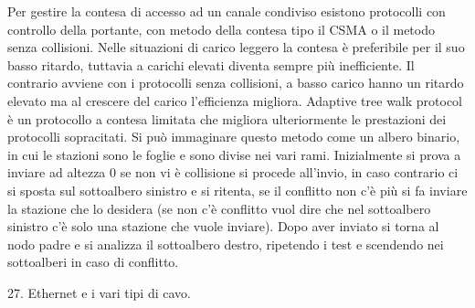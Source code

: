 Per gestire la contesa di accesso ad un canale condiviso esistono protocolli con controllo della portante, con metodo della contesa tipo il CSMA o il metodo senza collisioni. Nelle situazioni di carico leggero la contesa è preferibile per il suo basso ritardo, tuttavia a carichi elevati diventa sempre più inefficiente. Il contrario avviene con i protocolli senza collisioni, a basso carico hanno un ritardo elevato ma al crescere del carico l’efficienza migliora.
Adaptive tree walk protocol è un protocollo a contesa limitata che migliora ulteriormente le prestazioni dei protocolli sopracitati.
Si può immaginare questo metodo come un albero binario, in cui le stazioni sono le foglie e sono divise nei vari rami. Inizialmente si prova a inviare ad altezza 0 se non vi è collisione si procede all’invio, in caso contrario ci si sposta sul sottoalbero sinistro e si ritenta, se il conflitto non c’è più si fa inviare la stazione che lo desidera (se non c’è conflitto vuol dire che nel sottoalbero sinistro c’è solo una stazione che vuole inviare). Dopo aver inviato si torna al nodo padre e si analizza il sottoalbero destro, ripetendo i test e scendendo nei sottoalberi in caso di conflitto.
 
27.	Ethernet e i vari tipi di cavo.


